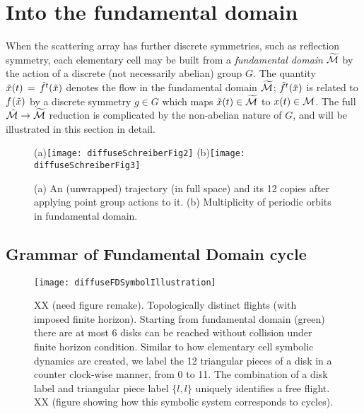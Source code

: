 \documentclass[aps,pre,preprint,groupedaddress,floatfix]{revtex4-1}
\begin{document}
\section{Into the fundamental domain\label{s-SymmetryReduction}
}

 When the scattering array has further discrete symmetries, such as reflection symmetry, each elementary cell may be built from a {\em fundamental domain} ${\widetilde {{\cal M}}}$ by the action of a discrete (not necessarily abelian) group $G$. The quantity $\tilde x(t)\,=\,{\tilde{f}^{t}(\tilde x)}$ denotes the flow in the fundamental domain ${\widetilde {{\cal M}}}$; ${\tilde{f}^{t}(\tilde x)}$ is related to ${f^{}(\tilde x)}$ by a discrete symmetry $g \in G$ which maps $\tilde x(t)\in {\widetilde {\ensuremath{{\cal M}}}}$ to ${x}(t) \in {\ensuremath{{\cal M}}}$. The full $\hat {{\cal M}} \rightarrow {\widetilde {\ensuremath{{\cal M}}}}$ reduction is complicated by the non-abelian nature of $G$, and will be illustrated in this section in detail.


\begin{figure}[htbp]
\begin{center}
(a)\texttt{[image: diffuseSchreiberFig2]}
(b)\texttt{[image: diffuseSchreiberFig3]}
\end{center}
\caption[]{ \label{fig:schrieberFig23}
(a) An (unwrapped) trajectory (in full space) and its 12 copies after applying point group actions to it. (b) Multiplicity of periodic orbits in fundamental domain.}
\end{figure}

\subsection{Grammar of Fundamental Domain cycle}
\begin{figure}[htbp]
\texttt{[image: diffuseFDSymbolIllustration]}
\caption{\label{fig-fdflights} XX (need figure remake). Topologically distinct flights (with imposed finite horizon). Starting from fundamental domain (green) there are at most 6 disks can be reached without collision under finite horizon condition. Similar to how elementary cell symbolic dynamics are created, we label the 12 triangular pieces of a disk in a counter clock-wise manner, from 0 to 11. The combination of a disk label and triangular piece label $\{l,l\}$ uniquely identifies a free flight. XX (figure showing how this symbolic system corresponds to cycles).}
\end{figure}
\end{document}
